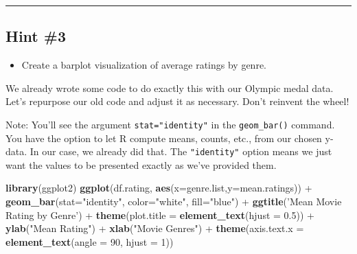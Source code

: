 \documentclass[]{book}
\newenvironment{Shaded}{\begin{snugshade}}{\end{snugshade}}
\newcommand{\KeywordTok}[1]{\textcolor[rgb]{0.13,0.29,0.53}{\textbf{{#1}}}}
\newcommand{\DataTypeTok}[1]{\textcolor[rgb]{0.13,0.29,0.53}{{#1}}}
\newcommand{\DecValTok}[1]{\textcolor[rgb]{0.00,0.00,0.81}{{#1}}}
\newcommand{\FloatTok}[1]{\textcolor[rgb]{0.00,0.00,0.81}{{#1}}}
\newcommand{\StringTok}[1]{\textcolor[rgb]{0.31,0.60,0.02}{{#1}}}
\newcommand{\NormalTok}[1]{{#1}}
\providecommand{\tightlist}{%
  \setlength{\itemsep}{0pt}\setlength{\parskip}{0pt}}
\begin{document}
\begin{center}\rule{0.5\linewidth}{\linethickness}\end{center}

\subsection{Hint \#3}\label{hint-3-1}

\begin{itemize}
\tightlist
\item
  Create a barplot visualization of average ratings by genre.
\end{itemize}

We already wrote some code to do exactly this with our Olympic medal
data. Let's repurpose our old code and adjust it as necessary. Don't
reinvent the wheel!

Note: You'll see the argument \texttt{stat="identity"} in the
\texttt{geom\_bar()} command. You have the option to let R compute
means, counts, etc., from our chosen y-data. In our case, we already did
that. The \texttt{"identity"} option means we just want the values to be
presented exactly as we've provided them.

\begin{Shaded}
\begin{Highlighting}[]
\KeywordTok{library}\NormalTok{(ggplot2)}
\KeywordTok{ggplot}\NormalTok{(df.rating, }\KeywordTok{aes}\NormalTok{(}\DataTypeTok{x=}\NormalTok{genre.list,}\DataTypeTok{y=}\NormalTok{mean.ratings)) +}
\StringTok{  }\KeywordTok{geom_bar}\NormalTok{(}\DataTypeTok{stat=}\StringTok{"identity"}\NormalTok{, }\DataTypeTok{color=}\StringTok{"white"}\NormalTok{, }\DataTypeTok{fill=}\StringTok{"blue"}\NormalTok{) +}
\StringTok{  }\KeywordTok{ggtitle}\NormalTok{(}\StringTok{'Mean Movie Rating by Genre'}\NormalTok{) +}\StringTok{ }
\StringTok{  }\KeywordTok{theme}\NormalTok{(}\DataTypeTok{plot.title =} \KeywordTok{element_text}\NormalTok{(}\DataTypeTok{hjust =} \FloatTok{0.5}\NormalTok{)) +}\StringTok{ }
\StringTok{  }\KeywordTok{ylab}\NormalTok{(}\StringTok{"Mean Rating"}\NormalTok{) +}\StringTok{ }
\StringTok{  }\KeywordTok{xlab}\NormalTok{(}\StringTok{"Movie Genres"}\NormalTok{) +}\StringTok{ }
\StringTok{  }\KeywordTok{theme}\NormalTok{(}\DataTypeTok{axis.text.x =} \KeywordTok{element_text}\NormalTok{(}\DataTypeTok{angle =} \DecValTok{90}\NormalTok{, }\DataTypeTok{hjust =} \DecValTok{1}\NormalTok{))}
\end{Highlighting}
\end{Shaded}
\end{document}
